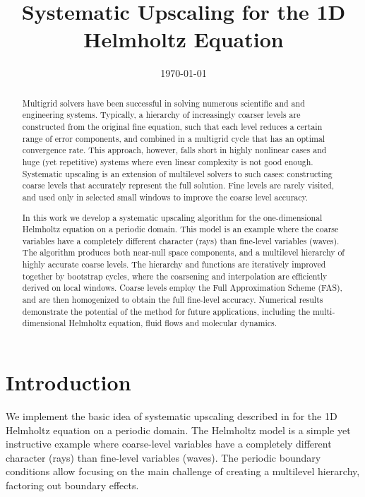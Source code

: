 \documentclass{article}
\title{Systematic Upscaling for the 1D Helmholtz Equation}
\author{}
\date{\today}
\begin{document}
\maketitle

\begin{abstract}
Multigrid solvers have been successful in solving numerous scientific and and engineering systems. Typically, a hierarchy of increasingly coarser levels are constructed from the original fine equation, such that each level reduces a certain range of error components, and combined in a multigrid cycle that has an optimal convergence rate. This approach, however, falls short in highly nonlinear cases and huge (yet repetitive) systems where even linear complexity is not good enough. Systematic upscaling is an extension of multilevel solvers to such cases: constructing coarse levels that accurately represent the full solution. Fine levels are rarely visited, and used only in selected small windows to improve the coarse level accuracy.

In this work we develop a systematic upscaling algorithm for the one-dimensional Helmholtz equation on a periodic domain. This model is an example where the coarse variables have a completely different character (rays) than fine-level variables (waves). The algorithm produces both near-null space components, and a multilevel hierarchy of highly accurate coarse levels. The hierarchy and functions are iteratively improved together by bootstrap cycles, where the coarsening and interpolation are efficiently derived on local windows. Coarse levels employ the Full Approximation Scheme (FAS), and are then homogenized to obtain the full fine-level accuracy. Numerical results demonstrate the potential of the method for future applications, including the multi-dimensional Helmholtz equation, fluid flows and molecular dynamics.
\end{abstract}

\section{Introduction}
\label{intro}
We implement the basic idea of systematic upscaling described in \cite{su} for the 1D Helmholtz equation on a periodic domain. The Helmholtz model is a simple yet instructive example where coarse-level variables have a completely different character (rays) than fine-level variables (waves). The periodic boundary conditions allow focusing on the main challenge of creating a multilevel hierarchy, factoring out boundary effects.
\end{document}
